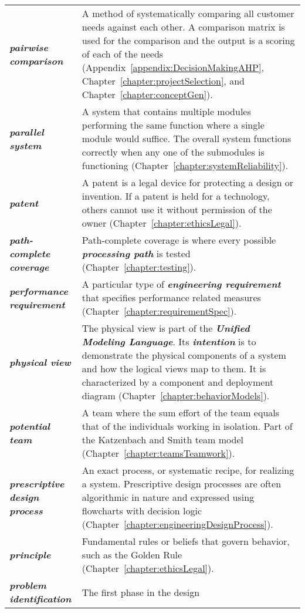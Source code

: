 \begin{longtable} { p{3cm} p{11cm}}
\emph{\textbf{pairwise comparison}} & A method of systematically
comparing all customer needs against each other. A comparison matrix is
used for the comparison and the output is a scoring of each of the needs
(Appendix~\ref{appendix:DecisionMakingAHP}, Chapter~\ref{chapter:projectSelection},
 and Chapter~\ref{chapter:conceptGen}). \B \\
\emph{\textbf{parallel system}} & A system that contains multiple
modules performing the same function where a single module would
suffice. The overall system functions correctly when any one of the
submodules is functioning (Chapter~\ref{chapter:systemReliability}). \B \\
\emph{\textbf{patent}} & A patent is a legal device for protecting a
design or invention. If a patent is held for a technology, others cannot
use it without permission of the owner (Chapter~\ref{chapter:ethicsLegal}). \B \\
\emph{\textbf{path-complete coverage}} & Path-complete coverage is where
every possible \emph{\textbf{processing path}} is tested (Chapter~\ref{chapter:testing}). \B \\
\emph{\textbf{performance requirement}} & A particular type of
\emph{\textbf{engineering requirement}} that specifies performance
related measures (Chapter~\ref{chapter:requirementSpec}). \B \\
\emph{\textbf{physical view}} & The physical view is part of the
\emph{\textbf{Unified Modeling Language}}. Its \emph{\textbf{intention}}
is to demonstrate the physical components of a system and how the
logical views map to them. It is characterized by a component and
deployment diagram (Chapter~\ref{chapter:behaviorModels}). \B \\
\emph{\textbf{potential team}} & A team where the sum effort of the team
equals that of the individuals working in isolation. Part of the
Katzenbach and Smith team model (Chapter~\ref{chapter:teamsTeamwork}). \B \\
\emph{\textbf{prescriptive design process}} & An exact process, or
systematic recipe, for realizing a system. Prescriptive design processes
are often algorithmic in nature and expressed using flowcharts with
decision logic (Chapter~\ref{chapter:engineeringDesignProcess}). \B \\
\emph{\textbf{principle}} & Fundamental rules or beliefs that govern
behavior, such as the Golden Rule (Chapter~\ref{chapter:ethicsLegal}). \B \\
\emph{\textbf{problem identification}} & The first phase in the design

\end{longtable}
